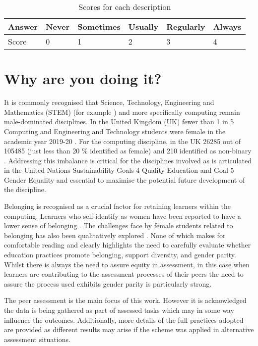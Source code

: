 \documentclass[sigconf, anonymous=true]{acmart}
\begin{document}
\begin{table}[]
\caption{Scores for each description}
\begin{tabular}{|l|l|l|l|l|l|}
\hline
Answer & Never & Sometimes & Usually & Regularly & Always \\ \hline
Score  & 0     & 1         & 2       & 3         & 4      \\ \hline
\end{tabular}
\label{tab:scores}
\end{table}


\section{Why are you doing it?}
It is commonly recognised that Science, Technology, Engineering and Mathematics (STEM) (for example \cite{Baird2018}) and more specifically computing remain male-dominated disciplines. In the United Kingdom (UK) fewer than 1 in 5 Computing and Engineering and Technology students were female in the academic year 2019-20 \cite{HESA}. For the computing discipline, in the UK 26285 out of 105485 (just less than 20 \% identified as female) and 210 identified as non-binary \cite{HESA}. Addressing this imbalance is critical for the disciplines involved as is articulated in the United Nations Sustainability Goals 4 Quality Education and Goal 5 Gender Equality \cite{UN} and essential to maximise the potential future development of the discipline.

Belonging \cite{Veilleux2013} is recognised as a crucial factor for retaining learners within the computing. Learners who self-identify as women have been reported to have a lower sense of belonging \cite{Mooney2020}. The challenges face by female students related to belonging has also been qualitatively explored \cite{Winter2021}. None of which makes for comfortable reading and clearly highlights the need to carefully evaluate whether education practices promote belonging, support diversity, and gender parity. Whilst there is always the need to assure equity in assessment, in this case when learners are contributing to the assessment processes of their peers the need to assure the process used exhibits gender parity is particularly strong. 

The peer assessment is the main focus of this work. However it is acknowledged the data is being gathered as part of assessed tasks which may in some way influence the outcomes. Additionally, more details of the full practices adopted are provided as different results may arise if the scheme was applied in alternative assessment situations.
\end{document}
